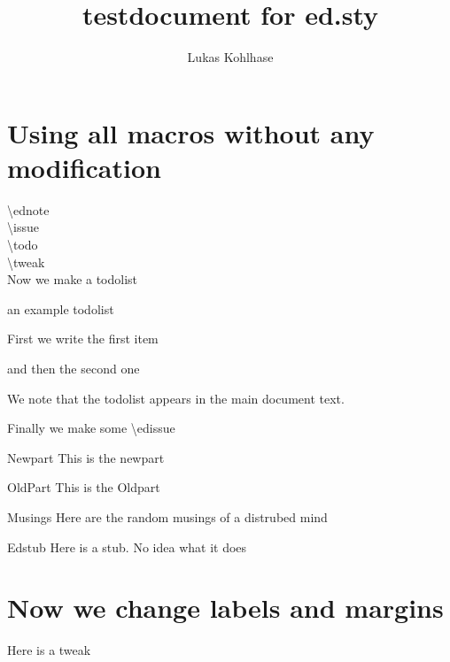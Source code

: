 \documentclass{article}
\author{Lukas Kohlhase}
\title{testdocument for ed.sty}
\begin{document}
\maketitle
\section{Using all macros without any modification}
\textbackslash ednote   \\
\textbackslash issue  \\
\textbackslash todo  \\
\textbackslash tweak  \\

Now we make a todolist 

\begin{todolist}{an example todolist} 
\item First we write the first item 
\item and then the second one 
\end{todolist}

We note that the todolist appears in the main document text. 


Finally we make some \textbackslash edissue    
\begin{Newpart}{Newpart}
This is the newpart 
\end{Newpart}
\begin{Oldpart}{OldPart}
This is the Oldpart
\end{Oldpart}
\begin{musings}{Musings}
Here are the random musings of a distrubed mind 
\end{musings}
\begin{edstub}{Edstub}
Here is a stub. No idea what it does 
\end{edstub}

\section{Now we change labels and margins}






Here is a tweak 
\end{document}
